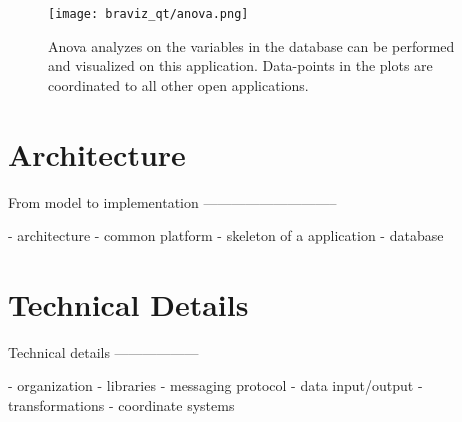 \begin{figure}
\centering
\texttt{[image: braviz\_qt/anova.png]} 
\caption{\label{fig_anova_1}Anova analyzes on the variables in the database can be performed and visualized on this application. Data-points in the plots are coordinated to all other open applications.}
\end{figure}



\section{Architecture}

\label{sec_arch}
From model to implementation
-----------------------------

- architecture
- common platform
- skeleton of a application
- database


\section{Technical Details}

\label{sec_tech} 

Technical details
------------------

- organization
- libraries
- messaging protocol
- data input/output
- transformations
- coordinate systems



